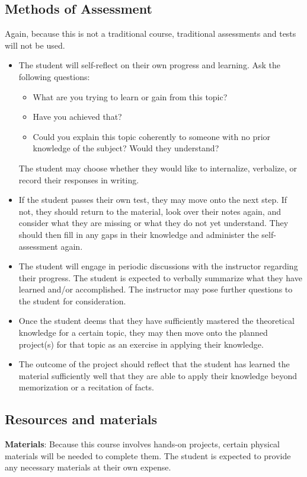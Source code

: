 \documentclass[12pt]{article}
\begin{document}
	\subsection{Methods of Assessment}
		Again, because this is not a traditional course, traditional assessments and tests will not be used. 
			\begin{itemize}
				\item The student will self-reflect on their own progress and learning. Ask the following questions:
				\begin{itemize}
					\item What are you trying to learn or gain from this topic?
					\item Have you achieved that?
					\item Could you explain this topic coherently to someone with no prior knowledge of the subject? Would they understand?
				\end{itemize}
				The student may choose whether they would like to internalize, verbalize, or record their responses in writing. 
				\item If the student passes their own test, they may move onto the next step. If not, they should return to the material, look over their notes again, and consider what they are missing or what they do not yet understand. They should then fill in any gaps in their knowledge and administer the self-assessment again. 
				\item The student will engage in periodic discussions with the instructor regarding their progress. The student is expected to verbally summarize what they have learned and/or accomplished. The instructor may pose further questions to the student for consideration. 
				\item Once the student deems that they have sufficiently mastered the theoretical knowledge for a certain topic, they may then move onto the planned project(s) for that topic as an exercise in applying their knowledge. 
				\item The outcome of the project should reflect that the student has learned the material sufficiently well that they are able to apply their knowledge beyond memorization or a recitation of facts. 
			\end{itemize}
	\subsection{Resources and materials}
		\textbf{Materials}: Because this course involves hands-on projects, certain physical materials will be needed to complete them. The student is expected to provide any necessary materials at their own expense. 
\end{document}
